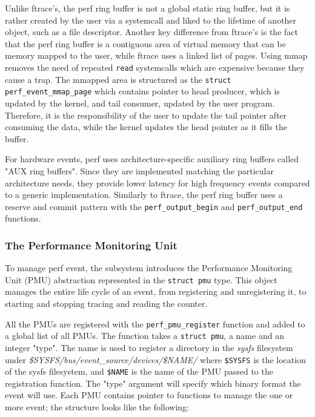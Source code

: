 Unlike ftrace's, the perf ring buffer is not a global static ring buffer, but it
is rather created by the user via a systemcall and liked to the lifetime of
another object, such as a file descriptor. Another key difference from ftrace's
is the fact that the perf ring buffer is a contiguous area of virtual memory
that can be memory mapped to the user, while ftrace uses a linked list of pages.
Using mmap removes the need of repeated \verb|read| systemcalls which are
expensive because they cause a trap. The mmapped area is structured as the
\verb|struct perf_event_mmap_page| which contains pointer to head producer,
which is updated by the kernel, and tail consumer, updated by the user program.
Therefore, it is the responsibility of the user to update the tail pointer after
consuming the data, while the kernel updates the head pointer as it fills the
buffer.

For hardware events, perf uses architecture-specific auxiliary ring buffers
called "AUX ring buffers". Since they are implemented matching the particular
architecture needs, they provide lower latency for high frequency events
compared to a generic implementation. Similarly to ftrace, the perf ring buffer
uses a reserve and commit pattern with the \verb|perf_output_begin| and
\verb|perf_output_end| functions.

\subsubsection*{The Performance Monitoring Unit}

To manage perf event, the subsystem introduces the Performance Monitoring Unit
(PMU) abstraction represented in the \verb|struct pmu| type. This object manages
the entire life cycle of an event, from registering and unregistering it, to
starting and stopping tracing and reading the counter.

All the PMUs are registered with the \verb|perf_pmu_register| function and added
to a global list of all PMUs. The function takes a \verb|struct pmu|, a name and
an integer "type". The name is used to register a directory in the
\textit{sysfs} filesystem under
\textit{\$SYSFS/bus/event\_source/devices/\$NAME/} where \verb|$SYSFS| is the
location of the sysfs filesystem, and \verb|$NAME| is the name of the PMU passed
to the registration function. The "type" argument will specify which binary
format the event will use. Each PMU contains pointer to functions to manage the
one or more event; the structure looks like the following:

